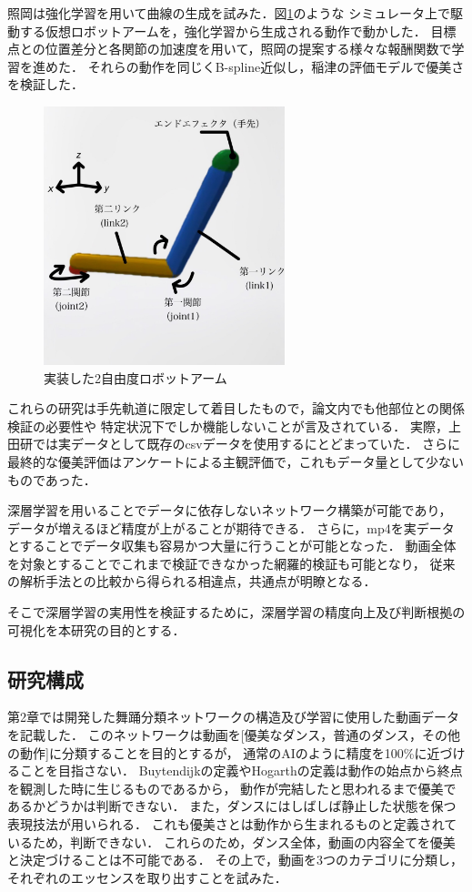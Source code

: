 照岡\cite{teruoka}は強化学習を用いて曲線の生成を試みた．図\ref{robot_arm}のような
シミュレータ上で駆動する仮想ロボットアームを，強化学習から生成される動作で動かした．
目標点との位置差分と各関節の加速度を用いて，照岡の提案する様々な報酬関数で学習を進めた．
それらの動作を同じくB-spline近似し，稲津の評価モデルで優美さを検証した．

\begin{figure}[b]
  \begin{center}
    \includegraphics[width=70mm]{images/quote/robot_arm.png}
  \end{center}
  \caption{実装した2自由度ロボットアーム}
  \label{robot_arm}
\end{figure}
\clearpage

これらの研究は手先軌道に限定して着目したもので，論文内でも他部位との関係検証の必要性や
特定状況下でしか機能しないことが言及されている．
実際，上田研では実データとして既存のcsvデータを使用するにとどまっていた．
さらに最終的な優美評価はアンケートによる主観評価で，これもデータ量として少ないものであった．

深層学習を用いることでデータに依存しないネットワーク構築が可能であり，
データが増えるほど精度が上がることが期待できる．
さらに，mp4を実データとすることでデータ収集も容易かつ大量に行うことが可能となった．
動画全体を対象とすることでこれまで検証できなかった網羅的検証も可能となり，
従来の解析手法との比較から得られる相違点，共通点が明瞭となる．

そこで深層学習の実用性を検証するために，深層学習の精度向上及び判断根拠の可視化を本研究の目的とする．

\subsection{研究構成}
第2章では開発した舞踊分類ネットワークの構造及び学習に使用した動画データを記載した．
このネットワークは動画を[優美なダンス，普通のダンス，その他の動作]に分類することを目的とするが，
通常のAIのように精度を100\%に近づけることを目指さない．
Buytendijkの定義やHogarthの定義は動作の始点から終点を観測した時に生じるものであるから，
動作が完結したと思われるまで優美であるかどうかは判断できない．
また，ダンスにはしばしば静止した状態を保つ表現技法が用いられる．
これも優美さとは動作から生まれるものと定義されているため，判断できない．
これらのため，ダンス全体，動画の内容全てを優美と決定づけることは不可能である．
その上で，動画を3つのカテゴリに分類し，それぞれのエッセンスを取り出すことを試みた．

